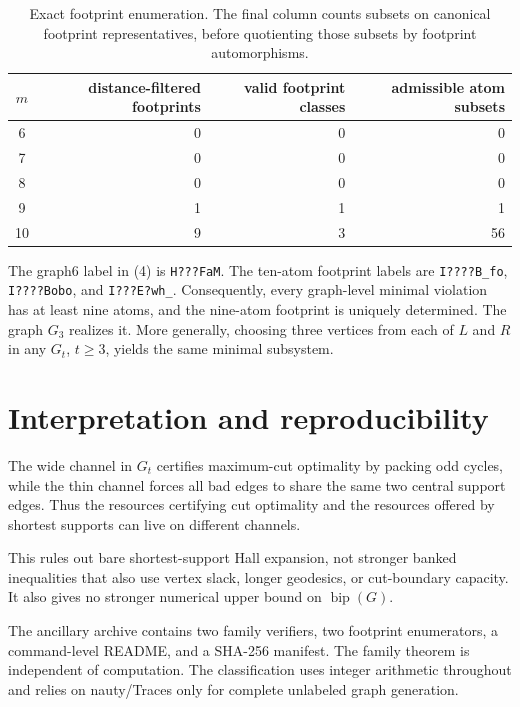 \documentclass[11pt]{article}
\theoremstyle{definition}
\newcommand{\bip}{\operatorname{bip}}
\begin{document}
\begin{table}[ht]
\centering
\begin{tabular}{c@{\quad}r@{\quad}r@{\quad}r}
\toprule
\(m\) & distance-filtered footprints & valid footprint classes
& admissible atom subsets\\
\midrule
6&0&0&0\\
7&0&0&0\\
8&0&0&0\\
9&1&1&1\\
10&9&3&56\\
\bottomrule
\end{tabular}
\caption{Exact footprint enumeration. The final column counts subsets on
canonical footprint representatives, before quotienting those subsets by
footprint automorphisms.}
\label{tab:counts}
\end{table}

The graph6 label in (4) is \texttt{H???FaM}. The ten-atom footprint labels
are \texttt{I????B\_fo}, \texttt{I????Bobo}, and
\texttt{I???E?wh\_}. Consequently, every graph-level minimal violation has
at least nine atoms, and the nine-atom footprint is uniquely determined.
The graph \(G_3\) realizes it. More generally, choosing three vertices
from each of \(L\) and \(R\) in any \(G_t\), \(t\ge3\), yields the same
minimal subsystem.

\section{Interpretation and reproducibility}

The wide channel in \(G_t\) certifies maximum-cut optimality by packing
odd cycles, while the thin channel forces all bad edges to share the same
two central support edges. Thus the resources certifying cut optimality
and the resources offered by shortest supports can live on different
channels.

This rules out bare shortest-support Hall expansion, not stronger banked
inequalities that also use vertex slack, longer geodesics, or cut-boundary
capacity. It also gives no stronger numerical upper bound on \(\bip(G)\).

The ancillary archive contains two family verifiers, two footprint enumerators, a command-level README, and a SHA-256 manifest. The family theorem is independent of computation.
The classification uses integer arithmetic throughout and relies on
nauty/Traces only for complete unlabeled graph generation.
\end{document}
